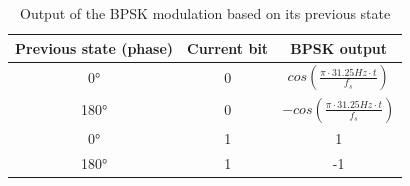 \begin{table}
	\begin{center}
		\begin{tabular}{c c | c}
			Previous state (phase) & Current bit & BPSK output \\\hline
			0° & 0 & $cos(\frac{\pi \cdot 31.25 Hz \cdot t}{f_s})$ \\
			180° & 0 & $-cos(\frac{\pi \cdot 31.25 Hz \cdot t}{f_s})$ \\
			0° & 1 & 1 \\
			180° & 1 & -1 \\\hline
		\end{tabular}
		\caption{Output of the BPSK modulation based on its previous state}
		\label{tab:bpsk_modulation}
	\end{center}
\end{table}
